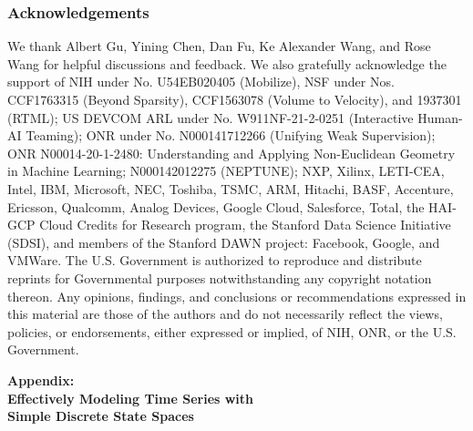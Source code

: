 \documentclass[11pt]{article}
\begin{document}
\section{Acknowledgements}
We thank Albert Gu, Yining Chen, Dan Fu, Ke Alexander Wang, and Rose Wang for helpful discussions and feedback. We also gratefully acknowledge the support of NIH under No. U54EB020405 (Mobilize), NSF under Nos. CCF1763315 (Beyond Sparsity), CCF1563078 (Volume to Velocity), and 1937301 (RTML); US DEVCOM ARL under No. W911NF-21-2-0251 (Interactive Human-AI Teaming); ONR under No. N000141712266 (Unifying Weak Supervision); ONR N00014-20-1-2480: Understanding and Applying Non-Euclidean Geometry in Machine Learning; N000142012275 (NEPTUNE); NXP, Xilinx, LETI-CEA, Intel, IBM, Microsoft, NEC, Toshiba, TSMC, ARM, Hitachi, BASF, Accenture, Ericsson, Qualcomm, Analog Devices, Google Cloud, Salesforce, Total, the HAI-GCP Cloud Credits for Research program,  the Stanford Data Science Initiative (SDSI), and members of the Stanford DAWN project: Facebook, Google, and VMWare. The U.S. Government is authorized to reproduce and distribute reprints for Governmental purposes notwithstanding any copyright notation thereon. Any opinions, findings, and conclusions or recommendations expressed in this material are those of the authors and do not necessarily reflect the views, policies, or endorsements, either expressed or implied, of NIH, ONR, or the U.S. Government.



%


%
\newpage
%
\begin{center}
    \huge\bf{Appendix:\\ Effectively Modeling Time Series with \\Simple Discrete State Spaces}
\end{center}

\appendix
{}
\part{}
\parttoc
%





%
\end{document}
